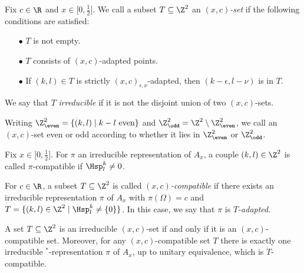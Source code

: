 \begin{Def} Fix $c\in \R$ and $x\in \lbrack 0,\frac{1}{2}\rbrack$. We call a subset $T\subseteq \Z^2$ an \emph{$(x,c)$-set} if the following conditions are satisfied: 
\begin{itemize} 
\item[$\bullet$] $T$ is not empty.
\item[$\bullet$] $T$ consists of $(x,c)$-adapted points.
\item[$\bullet$] If $(k,l)\in T$ is strictly $(x,c)_{\epsilon,\nu}$-adapted, then $(k-\epsilon,l-\nu)$ is in $T$.
\end{itemize}

We say that $T$ \emph{irreducible} if it is not the disjoint union of two $(x,c)$-sets.

Writing $\Z^2_{\even} = \{(k,l)\mid k-l \textrm{ even}\}$ and $\Z^2_{\odd} = \Z^2\setminus \Z^2_{\even}$, we call an $(x,c)$-set even or odd according to whether it lies in $\Z^2_{\even}$ or $\Z^2_{\odd}$.
\end{Def}

\begin{Def} Fix $x\in \lbrack 0,\frac{1}{2}\rbrack$. For $\pi$ an irreducible representation of $A_x$, a couple $(k,l)\in \Z^2$ is called $\pi$-compatible if $\Hsp^k_l\neq 0$. 

For $c\in \R$, a subset $T\subseteq \Z^2$ is called \emph{$(x,c)$-compatible} if there exists an irreducible representation $\pi$ of $A_x$ with $\pi(\Omega) = c$ and $T=\{(k,l)\in \Z^2\mid \Hsp^{k}_{l}\neq \{0\}\}$. In this case, we say that $\pi$ is \emph{$T$-adapted}.
\end{Def}

\begin{Prop}\label{PropClassRep} A set $T\subseteq \Z^2$ is an irreducible $(x,c)$-set if and only if it is an $(x,c)$-compatible set. Moreover, for any $(x,c)$-compatible set $T$ there is exactly one irreducible $^*$-representation $\pi$ of $A_x$, up to unitary equivalence, which is $T$-compatible.
\end{Prop}


